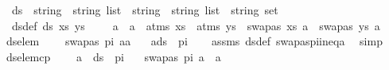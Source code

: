 %
\begin{isabellebody}%
%
%
\isadelimtheory
%
\endisadelimtheory
%
\isatagtheory
%
\endisatagtheory
{\isafoldtheory}%
%
\isadelimtheory
%
\endisadelimtheory
%
\isadelimdocument
%
\endisadelimdocument
%
\isatagdocument
%
\isamarkuptrue%
%
\endisatagdocument
{\isafolddocument}%
%
\isadelimdocument
%
\endisadelimdocument
{}\isamarkupfalse%
\ \ ds\ {\isacharcolon}{\kern0pt}{\isacharcolon}{\kern0pt}\ {\isachardoublequoteopen}{\isacharparenleft}{\kern0pt}string\ {\isasymtimes}\ string{\isacharparenright}{\kern0pt}\ list\ {\isasymRightarrow}\ {\isacharparenleft}{\kern0pt}string\ {\isasymtimes}\ string{\isacharparenright}{\kern0pt}\ list\ {\isasymRightarrow}\ string\ set{\isachardoublequoteclose}\ \isanewline
\ \ ds{\isacharunderscore}{\kern0pt}def{\isacharcolon}{\kern0pt}\ {\isachardoublequoteopen}ds\ xs\ ys\ \ {\isasymequiv}\ \ {\isacharbraceleft}{\kern0pt}\ a\ {\isachardot}{\kern0pt}\ a\ {\isasymin}\ {\isacharparenleft}{\kern0pt}atms\ xs\ {\isasymunion}\ atms\ ys{\isacharparenright}{\kern0pt}\ {\isasymand}\ {\isacharparenleft}{\kern0pt}swapas\ xs\ a\ {\isasymnoteq}\ swapas\ ys\ a{\isacharparenright}{\kern0pt}\ {\isacharbraceright}{\kern0pt}{\isachardoublequoteclose}\isanewline
\isanewline
{}\isamarkupfalse%
\ ds{\isacharunderscore}{\kern0pt}elem{\isacharcolon}{\kern0pt}\ \isanewline
\ \ \ {\isachardoublequoteopen}swapas\ pi\ a{\isasymnoteq}a{\isachardoublequoteclose}\isanewline
\ \ \ {\isachardoublequoteopen}a{\isasymin}ds\ {\isacharbrackleft}{\kern0pt}{\isacharbrackright}{\kern0pt}\ pi{\isachardoublequoteclose}\isanewline
%
\isadelimproof
\ \ %
\endisadelimproof
%
\isatagproof
{}\isamarkupfalse%
\ assms\ ds{\isacharunderscore}{\kern0pt}def\ swapas{\isacharunderscore}{\kern0pt}pi{\isacharunderscore}{\kern0pt}ineq{\isacharunderscore}{\kern0pt}a\ \isamarkupfalse%
\ simp%
\endisatagproof
{\isafoldproof}%
%
\isadelimproof
\isanewline
%
\endisadelimproof
\isanewline
{}\isamarkupfalse%
\ ds{\isacharunderscore}{\kern0pt}elem{\isacharunderscore}{\kern0pt}cp{\isacharcolon}{\kern0pt}\ \isanewline
\ \ \ {\isachardoublequoteopen}a\ {\isasymnotin}\ ds\ {\isacharbrackleft}{\kern0pt}{\isacharbrackright}{\kern0pt}\ pi{\isachardoublequoteclose}\isanewline
\ \ \ {\isachardoublequoteopen}swapas\ pi\ a\ {\isacharequal}{\kern0pt}\ a{\isachardoublequoteclose}\isanewline

\end{isabellebody}
